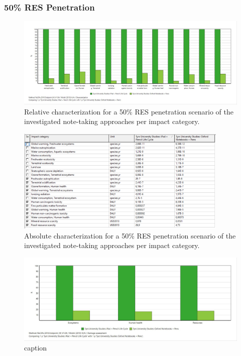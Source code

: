 \subsubsection{50\% RES Penetration}

\begin{figure}[H]
    \centering
    \includegraphics[width=\textwidth]{images/RES_50/Characterization_RES_50.JPG}
    \caption{Relative characterization for a 50\% RES penetration scenario of the investigated note-taking approaches per impact category.}\label{fig:characterization_RES_50}
\end{figure}

\begin{figure}[H]
    \centering
    \includegraphics[width=0.9\textwidth]{images/RES_50/Characterization_Table_RES_50.PNG}
    \caption{Absolute characterization for a 50\% RES penetration scenario of the investigated note-taking approaches per impact category.}\label{fig:characterization_table_RES_50}
\end{figure}

\begin{figure}[H]
    \centering
    \includegraphics[width=\textwidth]{images/RES_50/Damage_Assessment_RES_50.JPG}
    \caption{caption}\label{fig:damage_assessment_RES_50}
\end{figure}

